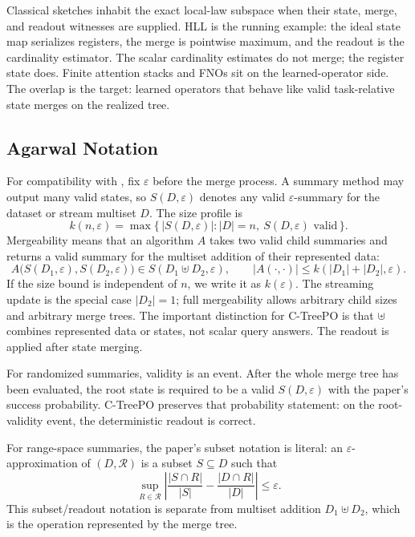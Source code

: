 Classical sketches inhabit the exact local-law subspace when their state,
merge, and readout witnesses are supplied. HLL is the running example: the
ideal state map serializes registers, the merge is pointwise maximum, and the
readout is the cardinality estimator. The scalar cardinality estimates do not
merge; the register state does. Finite attention stacks and FNOs sit on the
learned-operator side. The overlap is the target: learned operators that
behave like valid task-relative state merges on the realized tree.

\subsection{Agarwal Notation}

For compatibility with \citet{Agarwal2013MergeableTODS}, fix
$\varepsilon$ before the merge process. A summary method may output many valid
states, so \(S(D,\varepsilon)\) denotes any valid $\varepsilon$-summary for
the dataset or stream multiset $D$. The size profile is
\[
k(n,\varepsilon)
  =
  \max\{\, |S(D,\varepsilon)| : |D|=n,\ S(D,\varepsilon)\text{ valid}\,\}.
\]
Mergeability means that an algorithm $A$ takes two valid child summaries and
returns a valid summary for the multiset addition of their represented data:
\[
A\big(S(D_1,\varepsilon),S(D_2,\varepsilon)\big)
  \in S(D_1\uplus D_2,\varepsilon),
\qquad
|A(\cdot,\cdot)|\le k(|D_1|+|D_2|,\varepsilon).
\]
If the size bound is independent of $n$, we write it as $k(\varepsilon)$.
The streaming update is the special case \(|D_2|=1\); full mergeability allows
arbitrary child sizes and arbitrary merge trees. The important distinction for
C-TreePO is that \(\uplus\) combines represented data or states, not scalar
query answers. The readout is applied after state merging.

For randomized summaries, validity is an event. After the whole merge tree has
been evaluated, the root state is required to be a valid
\(S(D,\varepsilon)\) with the paper's success probability. C-TreePO preserves
that probability statement: on the root-validity event, the deterministic
readout is correct.

For range-space summaries, the paper's subset notation is literal: an
$\varepsilon$-approximation of \((D,\mathcal{R})\) is a subset
\(S\subseteq D\) such that
\[
\sup_{R\in\mathcal{R}}
\left|
  \frac{|S\cap R|}{|S|}
  -
  \frac{|D\cap R|}{|D|}
\right|
\le \varepsilon .
\]
This subset/readout notation is separate from multiset addition
\(D_1\uplus D_2\), which is the operation represented by the merge tree.

